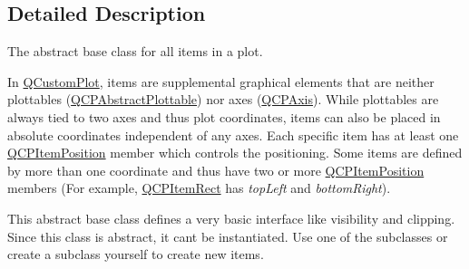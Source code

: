 \subsection{Detailed Description}
The abstract base class for all items in a plot. 

In \hyperlink{class_q_custom_plot}{Q\+Custom\+Plot}, items are supplemental graphical elements that are neither plottables (\hyperlink{class_q_c_p_abstract_plottable}{Q\+C\+P\+Abstract\+Plottable}) nor axes (\hyperlink{class_q_c_p_axis}{Q\+C\+P\+Axis}). While plottables are always tied to two axes and thus plot coordinates, items can also be placed in absolute coordinates independent of any axes. Each specific item has at least one \hyperlink{class_q_c_p_item_position}{Q\+C\+P\+Item\+Position} member which controls the positioning. Some items are defined by more than one coordinate and thus have two or more \hyperlink{class_q_c_p_item_position}{Q\+C\+P\+Item\+Position} members (For example, \hyperlink{class_q_c_p_item_rect}{Q\+C\+P\+Item\+Rect} has {\itshape top\+Left} and {\itshape bottom\+Right}).

This abstract base class defines a very basic interface like visibility and clipping. Since this class is abstract, it can\textquotesingle{}t be instantiated. Use one of the subclasses or create a subclass yourself to create new items.

